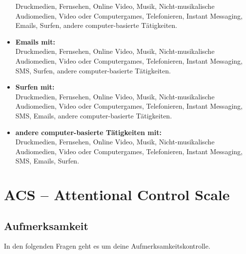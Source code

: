 \begin{itemize}
Druckmedien, Fernsehen, Online Video, Musik, Nicht-musikalische Audiomedien, Video oder Computergames, Telefonieren, Instant Messaging, Emails, Surfen, andere computer-basierte Tätigkeiten. 
        \item \textbf{Emails mit:}\\
Druckmedien, Fernsehen, Online Video, Musik, Nicht-musikalische Audiomedien, Video oder Computergames, Telefonieren, Instant Messaging, SMS, Surfen, andere computer-basierte Tätigkeiten. 
        \item \textbf{Surfen mit:}\\
Druckmedien, Fernsehen, Online Video, Musik, Nicht-musikalische Audiomedien, Video oder Computergames, Telefonieren, Instant Messaging, SMS, Emails, andere computer-basierte Tätigkeiten.
        \item \textbf{andere computer-basierte Tätigkeiten mit:}\\
Druckmedien, Fernsehen, Online Video, Musik, Nicht-musikalische Audiomedien, Video oder Computergames, Telefonieren, Instant Messaging, SMS, Emails, Surfen.        
    \end{itemize}
\section{ACS -- Attentional Control Scale}\label{anhangSection.macs}   
\subsection*{Aufmerksamkeit}  
In den folgenden Fragen geht es um deine Aufmerksamkeitskontrolle.
